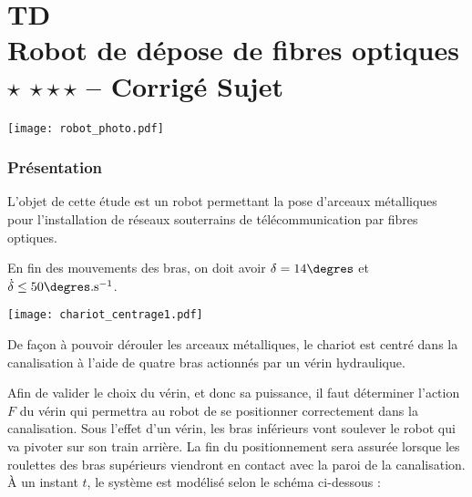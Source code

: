 
\chapter*{TD  \\ 
Robot de dépose de fibres optiques \ifnormal $\star$ \else \fi \iftdifficile $\star\star\star$ \else \fi -- \ifprof Corrigé \else Sujet \fi}

\iflivret {} \else
\ifprof  {} \else \fi
\fi

\setcounter{question}{0}


\begin{marginfigure} [2cm]
\texttt{[image: robot\_photo.pdf]}
\end{marginfigure}


\subsection*{Présentation}
\ifprof
\else
L'objet de cette étude est un robot permettant la pose d'arceaux métalliques pour l'installation de réseaux souterrains de télécommunication par fibres optiques.
\fi
\begin{obj}
En fin des mouvements des bras, on doit avoir $\delta=14\degres$ et $\dot{\delta}\leq 50\degres.\text{s}^{-1}$.
\end{obj}
%
\ifprof
\else


\begin{marginfigure}
\texttt{[image: chariot\_centrage1.pdf]}
\end{marginfigure}


De façon à pouvoir dérouler les arceaux métalliques, le chariot est centré dans la canalisation à l'aide de quatre bras actionnés par un vérin hydraulique.


Afin de valider le choix du vérin, et donc sa puissance, il faut déterminer l'action $F$ du vérin
qui permettra au robot de se positionner correctement dans la canalisation.
Sous l'effet
d'un vérin, les bras inférieurs vont soulever le
robot qui va pivoter sur son train arrière. La fin
du positionnement sera assurée lorsque les
roulettes des bras supérieurs viendront en
contact avec la paroi de la canalisation.
À un instant $t$, le système est modélisé selon le schéma ci-dessous :


